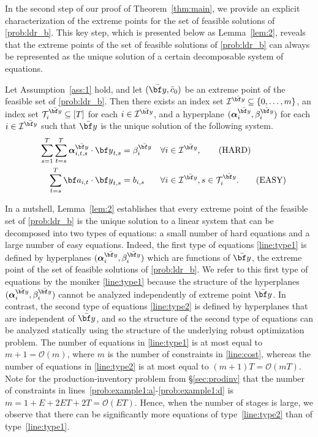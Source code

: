 \documentclass[nonblindrev,mnsc]{informs3} %
\newcommand{\ba}{{\bf a}}
\newcommand{\by}{{\bf y}}
\newcommand{\balpha}{{\boldsymbol{\alpha}}}
\begin{document}
In the second step of our proof of Theorem~\ref{thm:main}, we provide an explicit characterization of the extreme points for the set of feasible solutions of \eqref{prob:ldr_b}. This key step, which is presented below as Lemma~\ref{lem:2}, reveals that the extreme points of  the set of feasible solutions of \eqref{prob:ldr_b} can always be represented as the unique solution of a certain decomposable system of equations. 
\begin{lemma} \label{lem:2}
Let Assumption~\ref{ass:1} hold, and let  $(\bar{\by},\bar{c}_0)$ be an extreme point of the feasible set of \eqref{prob:ldr_b}. Then there exists 
an index set $\mathcal{I}^{\bar{\by}} \subseteq \{0,\ldots,m\}$,  
an index set $\mathcal{T}_i^{\bar{\by}} \subseteq [T]$  for each $i \in \mathcal{I}^{\bar{\by}}$, and 
a hyperplane $(\balpha_{i}^{\bar{\by}}, \beta_{i}^{\bar{\by}})$ for each $i \in \mathcal{I}^{\bar{\by}}$ 
 such that $\bar{\by}$ is the unique solution of the following system.
 \begin{align}
&&\sum_{s=1}^T \sum_{t=s}^T \balpha_{i,t,s}^{\bar{\by}} \cdot  \by_{t,s}   &= \beta_{i}^{\bar{\by}} && \forall i \in \mathcal{I}^{\bar{\by}}, \tag{HARD} \label{line:type1} \\
 && \sum_{t=s}^T \ba_{i,t} \cdot \by_{t,s} &=  b_{i,s} && \forall i \in \mathcal{I}^{\bar{\by}}, s \in \mathcal{T}_i^{\bar{\by}}. \tag{EASY} \label{line:type2}
 \end{align}
\end{lemma}

 In a nutshell, Lemma~\ref{lem:2} establishes that every extreme point of the feasible set of \eqref{prob:ldr_b} is the unique solution to a linear system that can be decomposed into two types of equations: a small number of hard equations  and a large number of easy equations. Indeed, the first type of equations \eqref{line:type1} is defined by hyperplanes $(\balpha_{i}^{\bar{\by}}, \beta_{i}^{\bar{\by}})$ which are functions of $\bar{\by}$, the extreme point of the set of feasible solutions of \eqref{prob:ldr_b}. We refer to this first type of equations by the moniker  \eqref{line:type1} because the structure of the hyperplanes $(\balpha_{i}^{\bar{\by}}, \beta_{i}^{\bar{\by}})$ cannot be analyzed independently of extreme point $\bar{\by}$. 
In contrast, the second type of equations \eqref{line:type2} is defined by hyperplanes that are independent of $\bar{\by}$, and so the structure of the second type of equations can be analyzed statically using the structure of the underlying robust optimization problem. 
The number of equations in \eqref{line:type1} is at most equal to $m+1 = \mathcal{O}(m)$, where $m$ is the number of constraints in \eqref{line:cost}, whereas the number of equations in \eqref{line:type2} is at most equal to  $(m+1)T = \mathcal{O}(mT)$. Note for the production-inventory problem from \S\ref{sec:prodinv} that the number of constraints in lines~\eqref{prob:example1:a}-\eqref{prob:example1:d} is $m = 1 + E + 2ET + 2T = \mathcal{O}(ET)$. 
Hence,  when the number of stages is large, we observe that there can be significantly more equations of type~\eqref{line:type2} than of  type~\eqref{line:type1}. 
\end{document}
